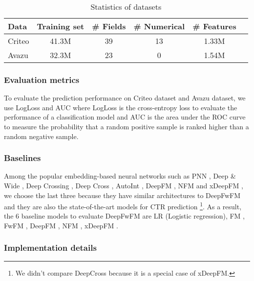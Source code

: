 \documentclass[sigconf]{acmart}
\begin{document}
\begin{table}
 \caption{Statistics of datasets}
  \centering
  \begin{tabular}{lccccr}
    \toprule
Data     & Training set  & \#  Fields  & \# Numerical   & \# Features & \\
    \midrule
    Criteo        &  41.3M & 39 & 13 & 1.33M    \\
    
    Avazu       & 32.3M & 23 & 0 & 1.54M \\
    \bottomrule
  \end{tabular}
  \label{tab:table}
\end{table}

\subsubsection{Evaluation metrics}

To evaluate the prediction performance on Criteo dataset and Avazu dataset, we use LogLoss and AUC where LogLoss is the cross-entropy loss to evaluate the performance of a classification model and AUC is the area under the ROC curve to measure the probability that a random positive sample is ranked higher than a random negative sample. 




\subsubsection{Baselines}

Among the popular embedding-based neural networks such as PNN \cite{PNN}, Deep \& Wide \cite{deepwide}, Deep Crossing \cite{deepcrossing}, Deep Cross \cite{deepcross}, AutoInt \cite{autoint}, DeepFM \cite{deepfm}, NFM \cite{NFM} and xDeepFM \cite{xdeepfm}, we choose the last three because they have similar architectures to DeepFwFM and they are also the state-of-the-art models for CTR prediction \footnote{We didn't compare DeepCross because it is a special case of xDeepFM.}. As a result, the 6 baseline models to evaluate DeepFwFM are LR (Logistic regression), FM \cite{FM}, FwFM \cite{fwfm}, DeepFM \cite{deepfm}, NFM \cite{NFM}, xDeepFM \cite{xdeepfm}. 


\subsubsection{Implementation details}
\end{document}
